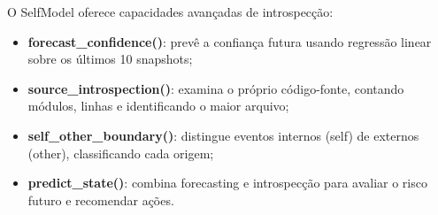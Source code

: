O SelfModel oferece capacidades avançadas de introspecção:

\begin{itemize}
\item \textbf{forecast\_confidence()}: prevê a confiança futura usando
regressão linear sobre os últimos 10 snapshots;
\item \textbf{source\_introspection()}: examina o próprio código-fonte,
contando módulos, linhas e identificando o maior arquivo;
\item \textbf{self\_other\_boundary()}: distingue eventos internos
(self) de externos (other), classificando cada origem;
\item \textbf{predict\_state()}: combina forecasting e introspecção
para avaliar o risco futuro e recomendar ações.
\end{itemize}

